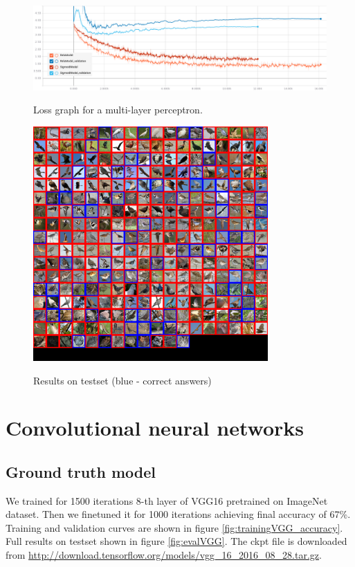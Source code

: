 \documentclass[a4paper]{article}
\begin{document}
\begin{figure}[h]
    \caption[]{Loss graph for a multi-layer perceptron.}
    \centering
    \includegraphics[page=2,width=1.0\textwidth]{training_loss.png}
    \label{fig:training_loss}
\end{figure}



\begin{figure}[h]
    \caption[]{Results on testset (blue - correct answers)}
    \centering
    \includegraphics[page=2,width=0.8\textwidth]{eval.png}
    \label{fig:eval}
\end{figure}

\section{Convolutional neural networks}

\subsection{Ground truth model}

We trained for 1500 iterations 8-th layer of VGG16\cite{VGG16}
pretrained on ImageNet\cite{ImageNet} dataset.
Then we finetuned it for 1000 iterations achieving final accuracy of 67\%.
Training and validation curves are shown in figure \ref{fig:trainingVGG_accuracy}. %
Full results on testset shown in figure \ref{fig:evalVGG}.
The ckpt file is downloaded from \url{http://download.tensorflow.org/models/vgg_16_2016_08_28.tar.gz}.
\end{document}
